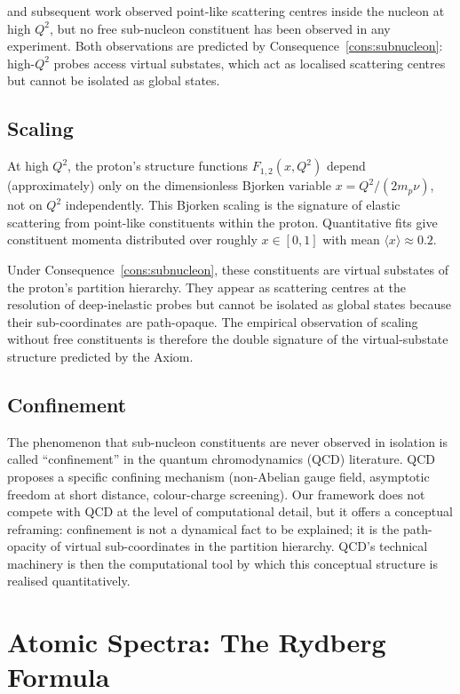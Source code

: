 \documentclass[11pt,twocolumn,a4paper]{article}
\theoremstyle{axiomstyle}
\theoremstyle{conseqstyle}
\theoremstyle{definition}
\theoremstyle{remark}
\begin{document}
\citet{friedman1972} and subsequent work observed point-like scattering centres inside the nucleon at high $Q^{2}$, but no free sub-nucleon constituent has been observed in any experiment. Both observations are predicted by Consequence~\ref{cons:subnucleon}: high-$Q^{2}$ probes access virtual substates, which act as localised scattering centres but cannot be isolated as global states.

\subsection{Scaling}

At high $Q^{2}$, the proton's structure functions $F_{1,2}(x,Q^{2})$ depend (approximately) only on the dimensionless Bjorken variable $x=Q^{2}/(2m_{p}\nu)$, not on $Q^{2}$ independently. This Bjorken scaling is the signature of elastic scattering from point-like constituents within the proton. Quantitative fits give constituent momenta distributed over roughly $x\in[0,1]$ with mean $\langle x\rangle\approx 0.2$.

Under Consequence~\ref{cons:subnucleon}, these constituents are virtual substates of the proton's partition hierarchy. They appear as scattering centres at the resolution of deep-inelastic probes but cannot be isolated as global states because their sub-coordinates are path-opaque. The empirical observation of scaling without free constituents is therefore the double signature of the virtual-substate structure predicted by the Axiom.

\subsection{Confinement}

The phenomenon that sub-nucleon constituents are never observed in isolation is called ``confinement'' in the quantum chromodynamics (QCD) literature. QCD proposes a specific confining mechanism (non-Abelian gauge field, asymptotic freedom at short distance, colour-charge screening). Our framework does not compete with QCD at the level of computational detail, but it offers a conceptual reframing: confinement is not a dynamical fact to be explained; it is the path-opacity of virtual sub-coordinates in the partition hierarchy. QCD's technical machinery is then the computational tool by which this conceptual structure is realised quantitatively.

\section{Atomic Spectra: The Rydberg Formula}
\label{sec:atomicspectra}
\end{document}

